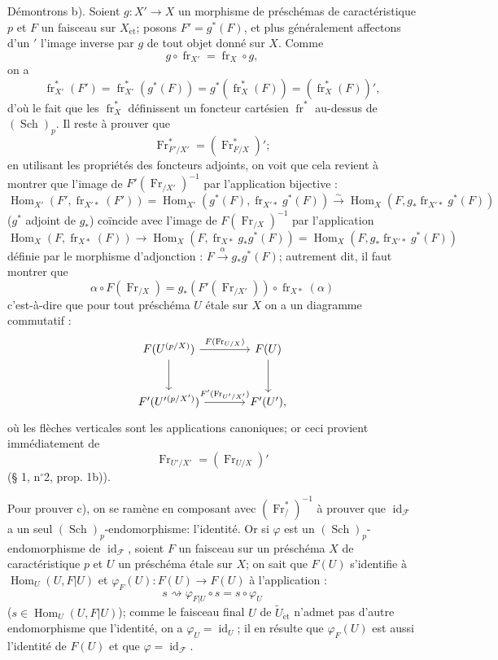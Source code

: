 \documentclass[11pt]{article}
\DeclareMathOperator{\Hom}{Hom}
\providecommand{\et}{\mathrm{\acute{e}t}}
\providecommand{\id}{\operatorname{id}}
\providecommand{\Hom}{\operatorname{Hom}}
\providecommand{\id}{\operatorname{id}}
\providecommand{\id}{\operatorname{id}}
\providecommand{\id}{\operatorname{id}}
\providecommand{\id}{\operatorname{id}}
\providecommand{\Hom}{\operatorname{Hom}}
\providecommand{\fr}{\operatorname{fr}}
\providecommand{\Fr}{\operatorname{Fr}}
\providecommand{\Sch}{\operatorname{Sch}}
\providecommand{\Fr}{\operatorname{Fr}}
\providecommand{\fr}{\operatorname{fr}}
\providecommand{\Sch}{\operatorname{Sch}}
\providecommand{\id}{\operatorname{id}}
\providecommand{\et}{\acute{e}t}
\begin{document}
Démontrons b). Soient $g:X'\to X$ un morphisme de préschémas de caractéristique $p$ et $F$ un faisceau sur $X_{\et}$; posons $F'=g^*(F)$, et plus généralement affectons d'un $'$ l'image inverse par $g$ de tout objet donné sur $X$. Comme
\[
g\circ\fr_{X'}=\fr_X\circ g,
\]
on a
\[
\fr_{X'}^*(F')=\fr_{X'}^*(g^*(F))=g^*(\fr_X^*(F))=(\fr_X^*(F))',
\]
d'où le
fait que les $\fr_X^*$ définissent un foncteur cartésien $\fr^*$ au-dessus de $(\Sch)_p$. Il reste à prouver que
\[
\Fr^*_{F'/X'}=(\Fr^*_{F/X})';
\]
en utilisant les propriétés des foncteurs adjoints, on voit que cela revient à montrer que l'image de $F'(\Fr_{/X'})^{-1}$ par l'application bijective :
\[
\Hom_{X'}(F',\fr_{X'*}(F'))
 =\Hom_{X'}(g^*(F),\fr_{X'*}g^*(F))
 \xrightarrow{\sim} \Hom_X(F,g_*\fr_{X'*}g^*(F))
\]
($g^*$ adjoint de $g_*$) coïncide avec l'image de $F(\Fr_{/X})^{-1}$ par l'application
\[
\Hom_X(F,\fr_{X*}(F))\longrightarrow
\Hom_X(F,\fr_{X*}g_*g^*(F))=
\Hom_X(F,g_*\fr_{X'*}g^*(F))
\]
définie par le morphisme d'adjonction : $F\xrightarrow{\alpha} g_*g^*(F)$; autrement dit, il faut montrer que
\[
\alpha\circ F(\Fr_{/X})=g_*(F'(\Fr_{/X'}))\circ\fr_{X*}(\alpha)
\]
c'est-à-dire que pour tout préschéma $U$ étale sur $X$ on a un diagramme commutatif :%
\[
\begin{tikzcd}[column sep=large,row sep=large]
F(U^{(p/X)}) \arrow[r,"F(\Fr_{U/X})"] \arrow[d]
& F(U) \arrow[d]\\
F'(U'{}^{(p/X')}) \arrow[r,"F'(\Fr_{U'/X'})"]
& F'(U') ,
\end{tikzcd}
\]
où les flèches verticales sont les applications canoniques; or ceci provient immédiatement de
\[
\Fr_{U'/X'}=(\Fr_{U/X})'
\]
(§ 1, n$^\circ$2, prop. 1b)).

Pour prouver c), on se ramène en composant avec $(\Fr^*_{/})^{-1}$ à prouver que $\id_{\mathcal F}$ a un seul $(\Sch)_p$-endomorphisme: l'identité. Or si $\varphi$ est un $(\Sch)_p$-endomorphisme de $\id_{\mathcal F}$, soient $F$ un faisceau sur un préschéma $X$ de caractéristique $p$ et $U$ un préschéma étale sur $X$; on sait que $F(U)$ s'identifie à $\Hom_U(U,F|U)$ 
et $\varphi_F(U):F(U)\to F(U)$ à l'application :
\[
s\rightsquigarrow \varphi_{F|U}\circ s=s\circ\varphi_U
\]
($s\in\Hom_U(U,F|U)$); comme le
faisceau final $U$ de $\widetilde U_{\et}$ n'admet pas d'autre endomorphisme que l'identité, on a $\varphi_U=\id_U$; il en résulte que $\varphi_F(U)$ est aussi l'identité de $F(U)$ et que $\varphi=\id_{\mathcal F}$.
\end{document}

